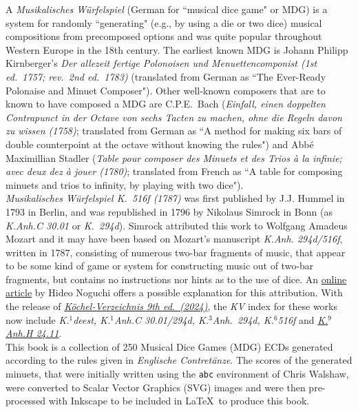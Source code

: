 \documentclass[letterpaper,x11names,svgnames,10pt]{article}
\begin{document}
A {\it Musikalisches W\"{u}rfelspiel} (German for ``musical dice game" or MDG) is a system for randomly ``generating" (e.g., by using a die or two dice) musical compositions from precomposed options and was quite popular throughout Western Europe in the 18th century.  The earliest known MDG is Johann Philipp Kirnberger's {\em Der allezeit fertige Polonoisen und Menuettencomponist (1st ed.\ 1757; rev.\ 2nd ed.\ 1783)} (translated from German as ``The Ever-Ready Polonaise and Minuet Composer").  Other well-known composers that are to known to have composed a MDG are C.P.E.\ Bach ({\em Einfall, einen doppelten Contrapunct in der Octave von sechs Tacten zu machen, ohne die Regeln davon zu wissen (1758)}; translated from German as ``A method for making six bars of double counterpoint at the octave without knowing the rules") and Abb\'{e} Maximillian Stadler ({\em Table pour composer des Minuets et des Trios \`{a} la infinie; avec deux dez \`{a} jouer (1780)}; translated from French as ``A table for composing minuets and trios to infinity, by playing with two dice"). \\

{\it Musikalisches W\"{u}rfelspiel K.\ 516f (1787)} was first published by J.J. Hummel in 1793 in Berlin, and was republished in 1796 by Nikolaus Simrock in Bonn (as {\it K.Anh.C 30.01} or {\it K.\ 294d}).  Simrock attributed this work to Wolfgang Amadeus Mozart and it may have been based on Mozart's manuscript {\it K.Anh. 294d/516f}, written in 1787, consisting of numerous two-bar fragments of music, that appear to be some kind of game or system for constructing music out of two-bar fragments, but contains no instructions nor hints as to the use of dice.  An \href{(http://www.asahi-net.or.jp/\~rb5h-ngc/e/k516f.htm}{online article} by Hideo Noguchi offers a possible explanation for this attribution. With the release of \href{https://kv.mozarteum.at/en}{\it K\"{o}chel-Verzeichnis 9th ed.\ (2024)}, the {\it KV} index for these works now include {\it K.$^1$deest, K.$^1$Anh.C 30.01/294d, K.$^3$Anh.\ 294d, K.$^6$516f} and \href{https://kv.mozarteum.at/en/work/musikalisches-alphabet-6025}{\it K.$^9$Anh.H 24.11}. \\

This book is a collection of 250 Musical Dice Games (MDG) ECDs generated according to the rules given in {\it Englische Contret\"{a}nze}.  The scores of the generated minuets, that were initially written using the \texttt{abc} environment of Chris Walshaw, were converted to Scalar Vector Graphics (SVG) images and were then pre-processed with Inkscape to be included in \LaTeX\ to produce this book.
\end{document}
